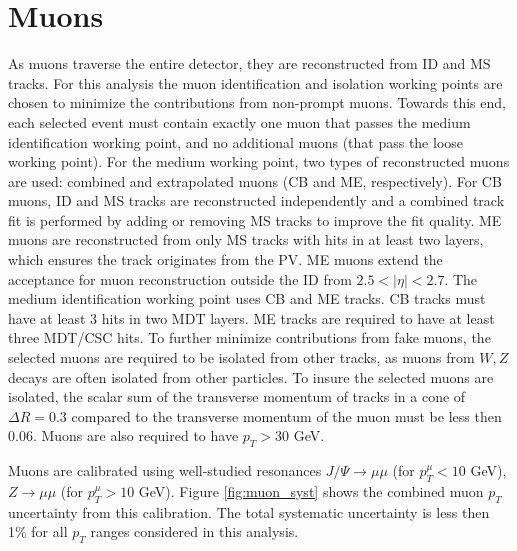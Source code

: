 \section{Muons}
As muons traverse the entire detector, they are reconstructed from ID and MS tracks. For this analysis the muon identification and isolation working points are chosen to minimize the contributions from non-prompt muons. Towards this end, each selected event must contain exactly one muon that passes the medium identification working point, and no additional muons (that pass the loose working point). For the medium working point, two types of reconstructed muons are used: combined and extrapolated muons (CB and ME, respectively). For CB muons, ID and MS tracks are reconstructed independently and a combined track fit is performed by adding or removing MS tracks to improve the fit quality. ME muons are reconstructed from only MS tracks with hits in at least two layers, which ensures the track originates from the PV. ME muons extend the acceptance for muon reconstruction outside the ID from $2.5 < |\eta| < 2.7$.
The medium identification working point uses CB and ME tracks. CB tracks must have at least 3 hits in two MDT layers. ME tracks are required to have at least three MDT/CSC hits. To further minimize contributions from fake muons, the selected muons are required to be isolated from other tracks, as muons from $W,Z$ decays are often isolated from other particles. To insure the selected muons are isolated, the scalar sum of the transverse momentum of tracks in a cone of $\Delta R = 0.3$ compared to the transverse momentum of the muon must be less then 0.06. Muons are also required to have $p_{T} > 30$ GeV.

Muons are calibrated using well-studied resonances $J/ \Psi \rightarrow \mu \mu$ (for $p_{T}^{\mu}< 10$ GeV),  $Z \rightarrow \mu \mu$ (for $p_{T}^{\mu} > 10$ GeV). Figure \ref{fig:muon_syst} shows the combined muon $p_{T}$ uncertainty from this calibration. The total systematic uncertainty is less then 1\% for all $p_{T}$ ranges considered in this analysis.


